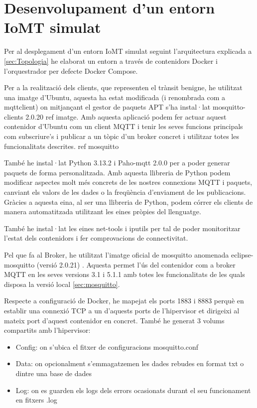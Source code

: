 \chapter{Desenvolupament d’un entorn IoMT simulat}

Per al desplegament d’un entorn IoMT simulat seguint l’arquitectura explicada a \ref{sec:Topologia} he elaborat un entorn a través de contenidors Docker i l’orquestrador per defecte Docker Compose.

Per a la realització dels clients, que representen el trànsit benigne, he utilitzat una imatge d’Ubuntu, aquesta ha estat modificada (i renombrada com a mqttclient) on mitjançant el gestor de paquets APT  s'ha instal·lat mosquitto-clients 2.0.20 {ref imatge}. Amb aquesta aplicació podem fer actuar aquest contenidor d'Ubuntu com un client MQTT i tenir les seves funcions principals com subscriure’s i publicar a un tòpic d’un broker concret i utilitzar totes les funcionalitats descrites. {ref mosquitto}

També he instal·lat Python 3.13.2 i Paho-mqtt 2.0.0 \cite{pahoexp} per a poder generar paquets de forma personalitzada. Amb aquesta llibreria de Python podem modificar aspectes molt més concrets de les nostres connexions MQTT i paquets, canviant els valors de les dades o la freqüència d’enviament de les publicacions. Gràcies a aquesta eina, al ser una llibreria de Python, podem córrer els clients de manera automatitzada utilitzant les eines pròpies del llenguatge.

També he instal·lat les eines net-tools i iputils per tal de poder monitoritzar l’estat dels contenidors i fer comprovacions de connectivitat.


Pel que fa al Broker, he utilitzat l’imatge oficial de mosquitto anomenada eclipse-mosquitto (versió 2.0.21) \cite{mosquittoimg}. Aquesta permet l’ús del contenidor com a broker MQTT en les seves versions 3.1 i 5.1.1 amb totes les funcionalitats de les quals disposa la versió local \ref{sec:mosquitto}.

Respecte a configuració de Docker, he mapejat els ports 1883 i 8883 perquè en establir una connexió TCP a un d’aquests ports de l'hipervisor et dirigeixi al mateix port d’aquest contenidor en concret. També he generat 3 volums compartits amb l'hipervisor:
\begin{itemize}
    \item Config: on s’ubica el fitxer de configuracions mosquitto.conf
    \item Data: on opcionalment s'emmagatzemen les dades rebudes en format txt o dintre una base de dades
    \item Log: on es guarden els logs dels errors ocasionats durant el seu funcionament en fitxers .log
\end{itemize} 

